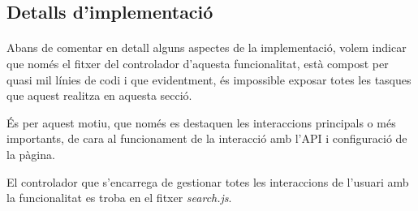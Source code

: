 \subsection{Detalls d'implementació}

    \paragraph{}
    Abans de comentar en detall alguns aspectes de la implementació, volem indicar que només el fitxer del controlador d'aquesta funcionalitat, està compost per quasi mil línies de codi i que evidentment, és impossible exposar totes les tasques que aquest realitza en aquesta secció.

    És per aquest motiu, que només es destaquen les interaccions principals o més importants, de cara al funcionament de la interacció amb l'API i configuració de la pàgina.

    El controlador que s'encarrega de gestionar totes les interaccions de l'usuari amb la funcionalitat es troba en el fitxer \emph{search.js}.

    
    
    
    
